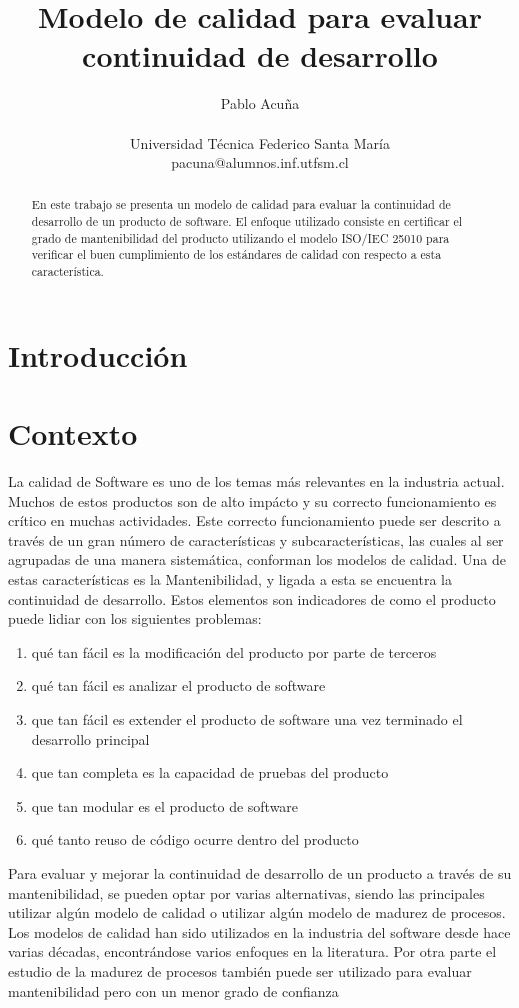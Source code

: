 \documentclass[letterpaper]{article}
\title{Modelo de calidad para evaluar continuidad de desarrollo}
\author{Pablo Acuña\\
\mbox{}\\
Universidad Técnica Federico Santa María \\
pacuna@alumnos.inf.utfsm.cl}
\begin{document}
\maketitle

\begin{abstract}
	En este trabajo se presenta un modelo de calidad para evaluar la continuidad de desarrollo de un
	producto de software. El enfoque utilizado consiste en certificar el grado de mantenibilidad del
	producto utilizando el modelo ISO/IEC 25010 para verificar el buen cumplimiento de los estándares
	de calidad con respecto a esta característica.
\end{abstract}

\section{Introducción}

\section{Contexto}
La calidad de Software es uno de los temas más relevantes en la industria actual. Muchos de estos productos
son de alto impácto y su correcto funcionamiento es crítico en muchas actividades. Este correcto funcionamiento
puede ser descrito a través de un gran número de características y subcaracterísticas, las cuales al ser agrupadas
de una manera sistemática, conforman los modelos de calidad. Una de estas características es la Mantenibilidad, y ligada
a esta se encuentra la continuidad de desarrollo. Estos elementos son indicadores de como el producto puede lidiar
con los siguientes problemas:
\begin{enumerate}
	\item qué tan fácil es la modificación del producto por parte de terceros
	\item qué tan fácil es analizar el producto de software
	\item que tan fácil es extender el producto de software una vez terminado el desarrollo principal
	\item que tan completa es la capacidad de pruebas del producto
	\item que tan modular es el producto de software
	\item qué tanto reuso de código ocurre dentro del producto
\end{enumerate}

Para evaluar y mejorar la continuidad de desarrollo de un producto a través de su mantenibilidad, se pueden optar por
varias alternativas, siendo las principales utilizar algún modelo de calidad o utilizar algún modelo de madurez de procesos.
Los modelos de calidad han sido utilizados en la industria del software desde hace varias décadas, encontrándose varios
enfoques en la literatura. Por otra parte el estudio de la madurez de procesos también puede ser utilizado para
evaluar mantenibilidad pero con un menor grado de confianza~\cite{Jones:2000:SAB:335582}
\end{document}
